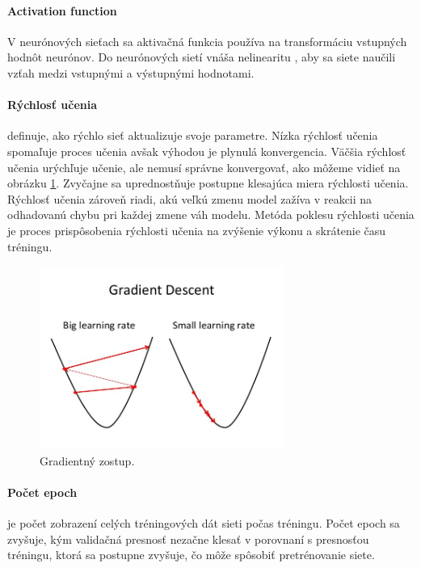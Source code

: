 \paragraph{Activation function}
V neurónových sieťach sa aktivačná funkcia používa na transformáciu vstupných hodnôt neurónov. Do neurónových sietí vnáša nelinearitu , aby sa siete naučili vzťah medzi vstupnými a výstupnými hodnotami.

\paragraph{Rýchlosť učenia} definuje, ako rýchlo sieť aktualizuje svoje parametre. Nízka rýchlosť učenia spomaľuje proces učenia avšak výhodou je plynulá konvergencia. Väčšia rýchlosť učenia urýchľuje učenie, ale nemusí správne konvergovať, ako môžeme vidieť na obrázku \ref{learningrate}. Zvyčajne sa uprednostňuje postupne klesajúca miera rýchlosti učenia. Rýchlosť učenia zároveň riadi, akú veľkú zmenu model zažíva v reakcii na odhadovanú chybu pri každej zmene váh modelu. Metóda poklesu rýchlosti učenia je proces prispôsobenia rýchlosti učenia na zvýšenie výkonu a skrátenie času tréningu.

\begin{figure}[!htbp]
  \centering
  \includegraphics[width=8cm]{img/learningrate.jpg}
  \caption{Gradientný zostup.}
  \label{learningrate}
\end{figure}

\paragraph{Počet epoch} je počet zobrazení celých tréningových dát sieti počas tréningu. Počet epoch sa zvyšuje, kým validačná presnosť nezačne klesať v porovnaní s presnosťou tréningu, ktorá sa postupne zvyšuje, čo môže spôsobiť pretrénovanie siete.

